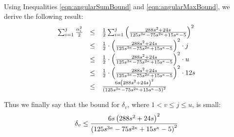 Using Inequalities \ref{eqn:angularSumBound} and \ref{eqn:angularMaxBound}, we derive the following result:
$$
\begin{array}{rcl}
\sum_{i=1}^j \frac{\alpha_i^2}{2} &\leq& \frac{1}{2}\sum_{i=1}^j  \left( \frac{288s^2+24s}{125 s^{3\kappa}-75 s^{2\kappa}+15 s^\kappa-5} \right)^2\\
&\leq&\frac{1}{2}\cdot  \left( \frac{288s^2+24s}{125 s^{3\kappa}-75 s^{2\kappa}+15 s^\kappa-5} \right)^2 \cdot j\\
&\leq&\frac{1}{2}\cdot  \left( \frac{288s^2+24s}{125 s^{3\kappa}-75 s^{2\kappa}+15 s^\kappa-5} \right)^2 \cdot u\\
&\leq&\frac{1}{2}\cdot  \left( \frac{288s^2+24s}{125 s^{3\kappa}-75 s^{2\kappa}+15 s^\kappa-5} \right)^2 \cdot 12s\\
&\leq&  \frac{6s\left( 288s^2+24s \right)^2}{\left( 125 s^{3\kappa}-75 s^{2\kappa}+15 s^\kappa-5 \right)^2}
\end{array}
$$

Thus we finally say that the bound for $\delta_v$, where $1<v\leq j\leq u$, is small:
\begin{equation}\label{eqn:verticalBound}
\delta_v \leq \frac{6s\left( 288s^2+24s \right)^2}{\left( 125 s^{3\kappa}-75 s^{2\kappa}+15 s^\kappa-5 \right)^2}
\end{equation}



